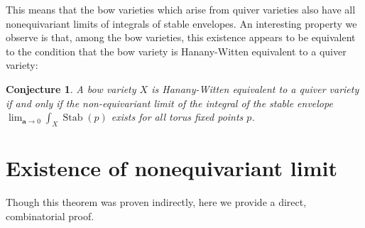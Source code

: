 \documentclass[12 pt]{article}
\theoremstyle{plain}
\theoremstyle{plain}
\theoremstyle{plain}
\theoremstyle{plain}
\theoremstyle{plain}
\theoremstyle{plain}
\theoremstyle{plain}
\theoremstyle{plain}
\theoremstyle{plain}
\newtheorem{conjecture}[theorem]{Conjecture}
\theoremstyle{plain}
\theoremstyle{remark}
\theoremstyle{remark}
\theoremstyle{definition}
\theoremstyle{definition}
\theoremstyle{definition}
\theoremstyle{definition}
\theoremstyle{definition}
\theoremstyle{definition}
\DeclareMathOperator{\Stab}{Stab}
\begin{document}
This means that the bow varieties which arise from quiver varieties also have all nonequivariant limits of integrals of stable envelopes. An interesting property we observe is that, among the bow varieties, this existence appears to be equivalent to the condition that the bow variety is Hanany-Witten equivalent to a quiver variety: 

\begin{conjecture}\label{bow}
A bow variety $X$ is Hanany-Witten equivalent to a quiver variety if and only if the non-equivariant limit of the integral of the stable envelope $\displaystyle \lim_{\textbf{a}\to 0}\int_{X}\Stab(p)$ exists for all torus fixed points $p$. 
\end{conjecture}

\appendix
\section{Existence of nonequivariant limit}
Though this theorem was proven indirectly, here we provide a direct, combinatorial proof.
\end{document}
